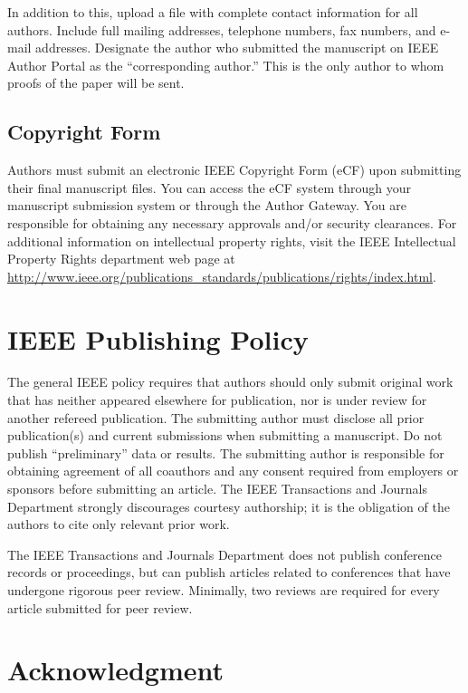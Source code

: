 \documentclass[journal,onecolumn,web]{ieeecolor}
\begin{document}
In addition to this, upload a file with complete contact information for all
authors. Include full mailing addresses, telephone numbers, fax numbers, and
e-mail addresses. Designate the author who submitted the manuscript on
IEEE Author Portal as the ``corresponding author.'' This is the only
author to whom proofs of the paper will be sent.

\subsection{Copyright Form}
Authors must submit an electronic IEEE Copyright Form (eCF) upon submitting 
their final manuscript files. You can access the eCF system through your 
manuscript submission system or through the Author Gateway. You are 
responsible for obtaining any necessary approvals and/or security 
clearances. For additional information on intellectual property rights, 
visit the IEEE Intellectual Property Rights department web page at 
\underline{http://www.ieee.org/publications\_standards/publications/rights/}\discretionary{}{}{}\underline{index.html}. 

\section*{IEEE Publishing Policy}
The general IEEE policy requires that authors should only submit original 
work that has neither appeared elsewhere for publication, nor is under 
review for another refereed publication. The submitting author must disclose 
all prior publication(s) and current submissions when submitting a 
manuscript. Do not publish ``preliminary'' data or results. The submitting 
author is responsible for obtaining agreement of all coauthors and any 
consent required from employers or sponsors before submitting an article. 
The IEEE Transactions and Journals Department strongly discourages courtesy 
authorship; it is the obligation of the authors to cite only relevant prior 
work.

The IEEE Transactions and Journals Department does not publish conference 
records or proceedings, but can publish articles related to conferences that 
have undergone rigorous peer review. Minimally, two reviews are required for 
every article submitted for peer review.

\section*{Acknowledgment}
\end{document}
